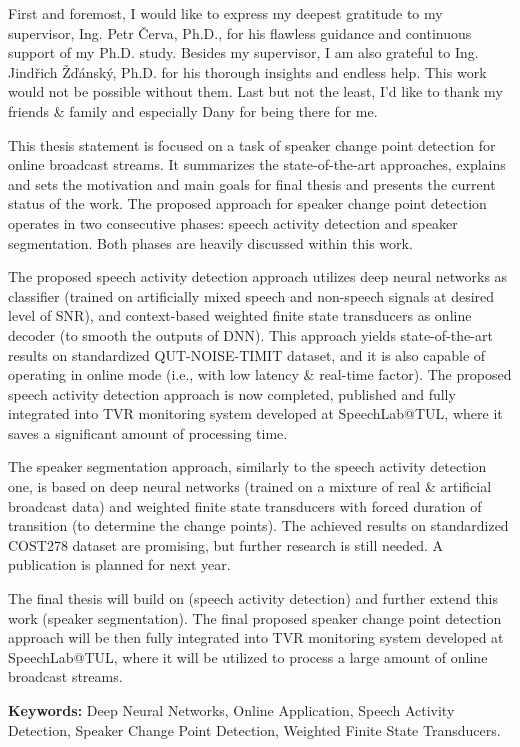 \documentclass[FM,noheader,EN,bwtitles]{tulthesis}
\begin{document}
\pagestyle{empty}
\pagestyle{plain}
\TULfooternopage
\nofootaddress

\begin{acknowledgement}%
First and foremost, I would like to express my deepest gratitude to my supervisor, Ing. Petr Červa, Ph.D., for his flawless guidance and continuous support of my Ph.D. study.
Besides my supervisor, I am also grateful to Ing. Jindřich Žďánský, Ph.D. for his thorough insights and endless help.
This work would not be possible without them.
Last but not the least, I'd like to thank my friends \& family and especially Dany for being there for me.

\end{acknowledgement}
\clearpage

\begin{abstractEN}%

This thesis statement is focused on a task of speaker change point detection for online broadcast streams.
It summarizes the state-of-the-art approaches, explains and sets the motivation and main goals for final thesis and presents the current status of the work.
The proposed approach for speaker change point detection operates in two consecutive phases: speech activity detection and speaker segmentation.
Both phases are heavily discussed within this work.

The proposed speech activity detection approach utilizes deep neural networks as classifier (trained on artificially mixed speech and non-speech signals at desired level of SNR), and context-based weighted finite state transducers as online decoder (to smooth the outputs of DNN).
This approach yields state-of-the-art results on standardized QUT-NOISE-TIMIT dataset, and it is also capable of operating in online mode (i.e., with low latency \& real-time factor).
The proposed speech activity detection approach is now completed, published and fully integrated into TVR monitoring system developed at SpeechLab@TUL, where it saves a significant amount of processing time.

The speaker segmentation approach, similarly to the speech activity detection one, is based on deep neural networks (trained on a mixture of real \& artificial broadcast data) and weighted finite state transducers with forced duration of transition (to determine the change points).
The achieved results on standardized COST278 dataset are promising, but further research is still needed.
A publication is planned for next year.

The final thesis will build on (speech activity detection) and further extend this work (speaker segmentation).  
The final proposed speaker change point detection approach will be then fully integrated into TVR monitoring system developed at SpeechLab@TUL, where it will be utilized to process a large amount of online broadcast streams.

\vspace{0.5cm}
\noindent\textbf{Keywords:}
Deep Neural Networks, Online Application, Speech Activity Detection, Speaker Change Point Detection, Weighted Finite State Transducers.
\end{abstractEN}
\end{document}
